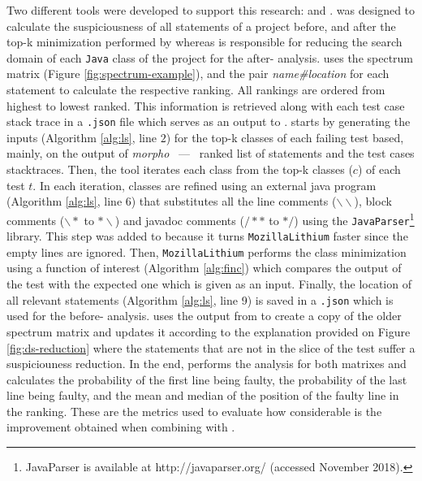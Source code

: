 \documentclass{article}
\begin{document}
Two different tools were developed to support this research: \morpho{} and \lithium{}. \morpho{} was designed to calculate the suspiciousness of all statements of a project before, and after the top-k minimization performed by \lithium{} whereas \lithium{} is responsible for reducing the search domain of each \texttt{Java} class of the project for the after-\sfl{} analysis. \morpho{} uses the spectrum matrix (Figure \ref{fig:spectrum-example}), and the pair \emph{name\#location} for each statement to calculate the respective ranking. All rankings are ordered from highest to lowest ranked. This information is retrieved along with each test case stack trace in a \texttt{.json} file which serves as an output to \lithium{}. \lithium{} starts by generating the inputs (Algorithm \ref{alg:ls}, line $2$) for the top-k classes of each failing test based, mainly, on the output of \emph{morpho} ~---~ ranked list of statements and the test cases stacktraces. Then, the tool iterates each class from the top-k classes ($c$) of each test $t$. In each iteration, classes are refined using an external java program (Algorithm \ref{alg:ls}, line 6) that substitutes all the line comments ($\backslash\backslash$), block comments ($\backslash*$ to $*\backslash$) and javadoc comments ($/**$ to $*/$) using the \texttt{JavaParser}\footnote{JavaParser is available at http://javaparser.org/ (accessed November 2018).} library. This step was added to \lithium{} because it turns \texttt{MozillaLithium} faster since the empty lines are ignored. Then, \texttt{MozillaLithium} performs the class minimization using a function of interest (Algorithm \ref{alg:finc}) which compares the output of the test with the expected one which is given as an input. Finally, the location of all relevant statements (Algorithm \ref{alg:ls}, line 9) is saved in a \texttt{.json} which is used for the before-\sfl{} analysis. \morpho{} uses the output from \lithium{} to create a copy of the older spectrum matrix and updates it according to the explanation provided on Figure \ref{fig:ds-reduction} where the statements that are not in the slice of the test suffer a suspiciouness reduction. In the end, \morpho{} performs the \sfl{} analysis for both matrixes and calculates the probability of the first line being faulty, the probability of the last line being faulty, and the mean and median of the position of the faulty line in the ranking. These are the metrics used to evaluate how considerable is the improvement obtained when combining \ds{} with \sfl{}.
\end{document}
